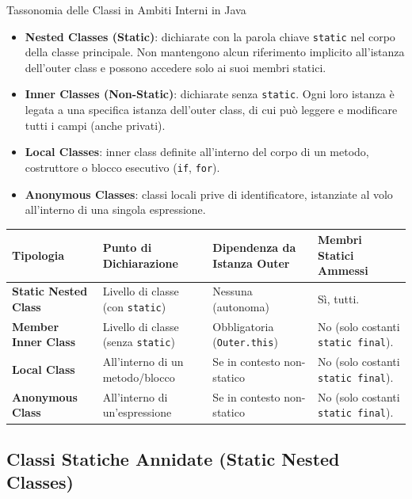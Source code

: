 \documentclass[12pt]{extarticle}
\begin{document}
\begin{cbox}{Tassonomia delle Classi in Ambiti Interni in Java}
\begin{itemize}
    \item \textbf{Nested Classes (Static)}: dichiarate con la parola chiave \texttt{static} nel corpo della classe principale. Non mantengono alcun riferimento implicito all'istanza dell'outer class e possono accedere solo ai suoi membri statici.
    \item \textbf{Inner Classes (Non-Static)}: dichiarate senza \texttt{static}. Ogni loro istanza è legata a una specifica istanza dell'outer class, di cui può leggere e modificare tutti i campi (anche privati).
    \item \textbf{Local Classes}: inner class definite all'interno del corpo di un metodo, costruttore o blocco esecutivo (\texttt{if}, \texttt{for}).
    \item \textbf{Anonymous Classes}: classi locali prive di identificatore, istanziate al volo all'interno di una singola espressione.
\end{itemize}
\end{cbox}

\begin{center}
\small
\begin{tabular}{p{3.2cm}p{3.8cm}p{3.8cm}p{3.4cm}}
    \toprule
    \textbf{Tipologia} & \textbf{Punto di Dichiarazione} & \textbf{Dipendenza da Istanza Outer} & \textbf{Membri Statici Ammessi} \\
    \midrule
    \textbf{Static Nested Class} & Livello di classe (con \texttt{static}) & Nessuna (autonoma) & Sì, tutti. \\
    \addlinespace
    \textbf{Member Inner Class} & Livello di classe (senza \texttt{static}) & Obbligatoria (\texttt{Outer.this}) & No (solo costanti \texttt{static final}). \\
    \addlinespace
    \textbf{Local Class} & All'interno di un metodo/blocco & Se in contesto non-statico & No (solo costanti \texttt{static final}). \\
    \addlinespace
    \textbf{Anonymous Class} & All'interno di un'espressione & Se in contesto non-statico & No (solo costanti \texttt{static final}). \\
    \bottomrule
\end{tabular}
\end{center}

\subsection{Classi Statiche Annidate (Static Nested Classes)}
\end{document}
